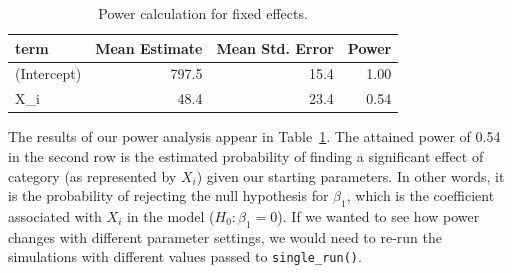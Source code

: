 \documentclass[
  english,
  doc,floatsintext]{apa6}
\newenvironment{Shaded}{\begin{snugshade}}{\end{snugshade}}
\newcommand{\CommentTok}[1]{\textcolor[rgb]{0.56,0.35,0.01}{\textit{#1}}}
\newcommand{\DataTypeTok}[1]{\textcolor[rgb]{0.13,0.29,0.53}{#1}}
\newcommand{\FloatTok}[1]{\textcolor[rgb]{0.00,0.00,0.81}{#1}}
\newcommand{\KeywordTok}[1]{\textcolor[rgb]{0.13,0.29,0.53}{\textbf{#1}}}
\newcommand{\NormalTok}[1]{#1}
\newcommand{\OperatorTok}[1]{\textcolor[rgb]{0.81,0.36,0.00}{\textbf{#1}}}
\newcommand{\StringTok}[1]{\textcolor[rgb]{0.31,0.60,0.02}{#1}}
\begin{document}
\begin{Shaded}
\end{Shaded}

\begin{table}[H]

\begin{center}
\begin{threeparttable}

\caption{\label{tab:calc-power-table}Power calculation for fixed effects.}

\begin{tabular}{lrrr}
\toprule
term & \multicolumn{1}{c}{Mean Estimate} & \multicolumn{1}{c}{Mean Std. Error} & \multicolumn{1}{c}{Power}\\
\midrule
(Intercept) & 797.5 & 15.4 & 1.00\\
X\_i & 48.4 & 23.4 & 0.54\\
\bottomrule
\end{tabular}

\end{threeparttable}
\end{center}

\end{table}

The results of our power analysis appear in Table~\ref{tab:calc-power-table}. The attained power of 0.54 in the second row is the estimated probability of finding a significant effect of category (as represented by \(X_i\)) given our starting parameters. In other words, it is the probability of rejecting the null hypothesis for \(\beta_1\), which is the coefficient associated with \(X_i\) in the model (\(H_0: \beta_1 = 0\)). If we wanted to see how power changes with different parameter settings, we would need to re-run the simulations with different values passed to \texttt{single\_run()}.
\end{document}
